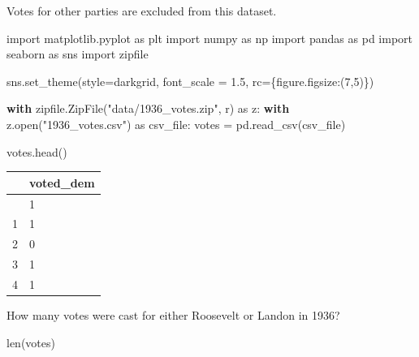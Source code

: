 \documentclass[
  letterpaper,
  DIV=11,
  numbers=noendperiod]{scrreprt}
\newenvironment{Shaded}{\begin{snugshade}}{\end{snugshade}}
\newcommand{\BuiltInTok}[1]{\textcolor[rgb]{0.00,0.23,0.31}{#1}}
\newcommand{\ControlFlowTok}[1]{\textcolor[rgb]{0.00,0.23,0.31}{\textbf{#1}}}
\newcommand{\DecValTok}[1]{\textcolor[rgb]{0.68,0.00,0.00}{#1}}
\newcommand{\FloatTok}[1]{\textcolor[rgb]{0.68,0.00,0.00}{#1}}
\newcommand{\ImportTok}[1]{\textcolor[rgb]{0.00,0.46,0.62}{#1}}
\newcommand{\NormalTok}[1]{\textcolor[rgb]{0.00,0.23,0.31}{#1}}
\newcommand{\OperatorTok}[1]{\textcolor[rgb]{0.37,0.37,0.37}{#1}}
\newcommand{\StringTok}[1]{\textcolor[rgb]{0.13,0.47,0.30}{#1}}
\begin{document}
Votes for other parties are excluded from this dataset.

\begin{Shaded}
\begin{Highlighting}[]
\ImportTok{import}\NormalTok{ matplotlib.pyplot }\ImportTok{as}\NormalTok{ plt}
\ImportTok{import}\NormalTok{ numpy }\ImportTok{as}\NormalTok{ np}
\ImportTok{import}\NormalTok{ pandas }\ImportTok{as}\NormalTok{ pd}
\ImportTok{import}\NormalTok{ seaborn }\ImportTok{as}\NormalTok{ sns}
\ImportTok{import}\NormalTok{ zipfile}

\NormalTok{sns.set\_theme(style}\OperatorTok{=}\StringTok{\textquotesingle{}darkgrid\textquotesingle{}}\NormalTok{, font\_scale }\OperatorTok{=} \FloatTok{1.5}\NormalTok{,}
\NormalTok{              rc}\OperatorTok{=}\NormalTok{\{}\StringTok{\textquotesingle{}figure.figsize\textquotesingle{}}\NormalTok{:(}\DecValTok{7}\NormalTok{,}\DecValTok{5}\NormalTok{)\})}
\end{Highlighting}
\end{Shaded}

\begin{Shaded}
\begin{Highlighting}[]
\ControlFlowTok{with}\NormalTok{ zipfile.ZipFile(}\StringTok{"data/1936\_votes.zip"}\NormalTok{, }\StringTok{\textquotesingle{}r\textquotesingle{}}\NormalTok{) }\ImportTok{as}\NormalTok{ z:}
    \ControlFlowTok{with}\NormalTok{ z.}\BuiltInTok{open}\NormalTok{(}\StringTok{"1936\_votes.csv"}\NormalTok{) }\ImportTok{as}\NormalTok{ csv\_file:}
\NormalTok{        votes }\OperatorTok{=}\NormalTok{ pd.read\_csv(csv\_file)}

\NormalTok{votes.head()}
\end{Highlighting}
\end{Shaded}

\begin{longtable}[]{@{}ll@{}}
\toprule\noalign{}
& voted\_dem \\
\midrule\noalign{}
\endhead
\bottomrule\noalign{}
\endlastfoot
0 & 1 \\
1 & 1 \\
2 & 0 \\
3 & 1 \\
4 & 1 \\
\end{longtable}

How many votes were cast for either Roosevelt or Landon in 1936?

\begin{Shaded}
\begin{Highlighting}[]
\BuiltInTok{len}\NormalTok{(votes)}
\end{Highlighting}
\end{Shaded}
\end{document}
